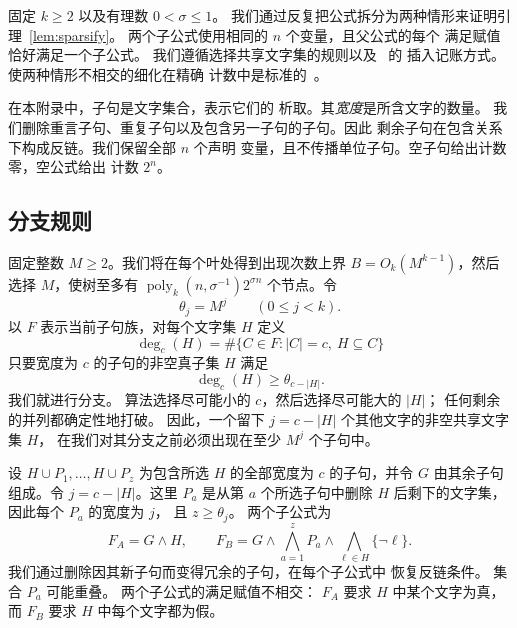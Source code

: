 \documentclass[11pt,reqno]{amsart}
\numberwithin{equation}{section}
\theoremstyle{definition}\newtheorem{definition}[theorem]{定义}
\theoremstyle{remark}\newtheorem{remark}[theorem]{注}
\newcommand{\poly}{\operatorname{poly}}
\renewcommand{\le}{\leqslant}
\renewcommand{\ge}{\geqslant}
\begin{document}
固定 $k\ge2$ 以及有理数 $0<\sigma\le1$。
我们通过反复把公式拆分为两种情形来证明引理~\ref{lem:sparsify}。
两个子公式使用相同的 $n$ 个变量，且父公式的每个
满足赋值恰好满足一个子公式。
我们遵循选择共享文字集的规则以及~\cite[第~6 节]{CIP} 的
插入记账方式。
使两种情形不相交的细化在精确
计数中是标准的~\cite[附录~A]{DHMTW}。

在本附录中，子句是文字集合，表示它们的
析取。其\emph{宽度}是所含文字的数量。
我们删除重言子句、重复子句以及包含另一子句的子句。因此
剩余子句在包含关系下构成反链。我们保留全部 $n$ 个声明
变量，且不传播单位子句。空子句给出计数零，空公式给出
计数 $2^n$。

\subsection{分支规则}

固定整数 $M\ge2$。我们将在每个叶处得到出现次数上界
$B=O_k(M^{k-1})$，然后选择 $M$，使树至多有
$\poly_k(n,\sigma^{-1})2^{\sigma n}$ 个节点。令
\[
 \theta_j=M^j\qquad(0\le j<k).
\]
以 $F$ 表示当前子句族，对每个文字集 $H$ 定义
\[
 \deg_c(H)=\#\{C\in F:|C|=c,\ H\subseteq C\}
\]
只要宽度为 $c$ 的子句的非空真子集 $H$ 满足
\begin{equation}\label{eq:spar-violation}
 \deg_c(H)\ge\theta_{c-|H|}.
\end{equation}
我们就进行分支。
算法选择尽可能小的 $c$，然后选择尽可能大的 $|H|$；
任何剩余的并列都确定性地打破。
因此，一个留下 $j=c-|H|$ 个其他文字的非空共享文字集 $H$，
在我们对其分支之前必须出现在至少 $M^j$ 个子句中。

设 $H\cup P_1,\ldots,H\cup P_z$ 为包含所选 $H$ 的全部宽度为 $c$
的子句，并令 $G$ 由其余子句组成。令
$j=c-|H|$。这里 $P_a$ 是从第 $a$ 个所选子句中删除
$H$ 后剩下的文字集，因此每个 $P_a$ 的宽度为 $j$，
且 $z\ge\theta_j$。
两个子公式为
\begin{equation}\label{eq:spar-children}
 F_A=G\wedge H,\qquad
 F_B=G\wedge\bigwedge_{a=1}^zP_a
          \wedge\bigwedge_{\ell\in H}\{\neg\ell\}.
\end{equation}
我们通过删除因其新子句而变得冗余的子句，在每个子公式中
恢复反链条件。
集合 $P_a$ 可能重叠。
两个子公式的满足赋值不相交：
$F_A$ 要求 $H$ 中某个文字为真，而 $F_B$
要求 $H$ 中每个文字都为假。
\end{document}
